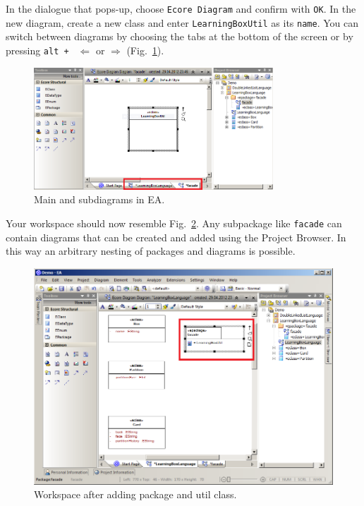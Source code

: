 In the dialogue that pops-up, choose \texttt{Ecore Diagram} and confirm with
\texttt{OK}.
In the new diagram, create a new class and enter \texttt{LearningBoxUtil} as its
\texttt{name}.  You can switch between diagrams by choosing the tabs at the
bottom of the screen or by pressing \texttt{alt + } $\Leftarrow$ or
$\Rightarrow$ (Fig.~\ref{fig:epackage_newdiagram}). 

\begin{figure}[htbp] 
	\centering
  \includegraphics[width=0.8\textwidth]{pics/memBoxBilder/memBox20}
	\caption{Main and subdiagrams in EA.}
	\label{fig:epackage_newdiagram}
\end{figure} 

Your workspace should now resemble Fig.~\ref{fig:epackage_completed}.
Any subpackage like \texttt{facade} can contain diagrams that can be
created and added using the Project Browser. 
In this way an arbitrary nesting of packages and diagrams is possible.

\begin{figure}[htbp]
	\centering
  \includegraphics[width=.8\textwidth]{pics/memBoxBilder/memBox22.png}
	\caption{Workspace after adding package and util class.}
	\label{fig:epackage_completed}
\end{figure}

